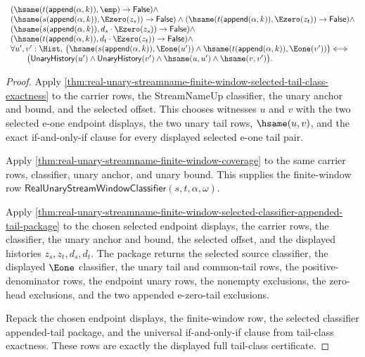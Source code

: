 \begin{theorem}
$$\begin{array}{l}
(\hsame(t(\mathsf{append}(\alpha,k)),\emp)\to\mathsf{False})\land\\
(\hsame(s(\mathsf{append}(\alpha,k)),\Ezero(z_s))\to\mathsf{False})\land
(\hsame(t(\mathsf{append}(\alpha,k)),\Ezero(z_t))\to\mathsf{False})\land\\
(\hsame(s(\mathsf{append}(\alpha,k)),d_s\cdot\Ezero(z_s))\to
\mathsf{False})\land\\
(\hsame(t(\mathsf{append}(\alpha,k)),d_t\cdot\Ezero(z_t))\to
\mathsf{False})\land\\
\forall u',v':\Hist,\,
\bigl(\hsame(s(\mathsf{append}(\alpha,k)),\Eone(u'))\land
\hsame(t(\mathsf{append}(\alpha,k)),\Eone(v'))\bigr)
\Longleftrightarrow\\
\qquad
\bigl(\mathsf{UnaryHistory}(u')\land
\mathsf{UnaryHistory}(v')\land
\hsame(u,u')\land
\hsame(v,v')\bigr).
\end{array}
$$
\end{theorem}
\begin{proof}
Apply
\autoref{thm:real-unary-streamname-finite-window-selected-tail-class-exactness}
to the carrier rows, the StreamNameUp classifier, the unary anchor and bound,
and the selected offset. This chooses witnesses $u$ and $v$ with the two selected
e-one endpoint displays, the two unary tail rows, $\hsame(u,v)$, and the exact
if-and-only-if clause for every displayed selected e-one tail pair.

Apply \autoref{thm:real-unary-streamname-finite-window-coverage} to the same
carrier rows, classifier, unary anchor, and unary bound. This supplies the
finite-window row $\mathsf{RealUnaryStreamWindowClassifier}(s,t,\alpha,\omega)$.

Apply
\autoref{thm:real-unary-streamname-finite-window-selected-classifier-appended-tail-package}
to the chosen selected endpoint displays, the carrier rows, the classifier, the
unary anchor and bound, the selected offset, and the displayed histories
$z_s,z_t,d_s,d_t$. The package returns the selected source classifier, the
displayed $\Eone$ classifier, the unary tail and common-tail rows, the
positive-denominator rows, the endpoint unary rows, the nonempty exclusions, the
zero-head exclusions, and the two appended e-zero-tail exclusions.

Repack the chosen endpoint displays, the finite-window row, the selected
classifier appended-tail package, and the universal if-and-only-if clause from
tail-class exactness. These rows are exactly the displayed full tail-class
certificate.
\end{proof}

